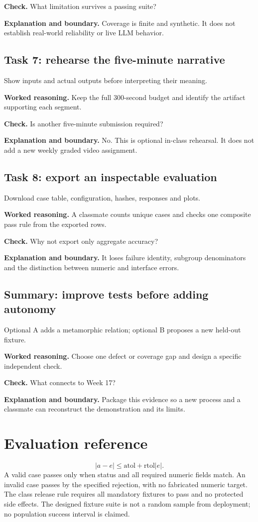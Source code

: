 \textbf{Check.} What limitation survives a passing suite?

\textbf{Explanation and boundary.} Coverage is finite and synthetic. It does not establish real-world reliability or live LLM behavior.

\subsection{Task 7: rehearse the five-minute narrative}
Show inputs and actual outputs before interpreting their meaning.

\textbf{Worked reasoning.} Keep the full 300-second budget and identify the artifact supporting each segment.

\textbf{Check.} Is another five-minute submission required?

\textbf{Explanation and boundary.} No. This is optional in-class rehearsal. It does not add a new weekly graded video assignment.

\subsection{Task 8: export an inspectable evaluation}
Download case table, configuration, hashes, responses and plots.

\textbf{Worked reasoning.} A classmate counts unique cases and checks one composite pass rule from the exported rows.

\textbf{Check.} Why not export only aggregate accuracy?

\textbf{Explanation and boundary.} It loses failure identity, subgroup denominators and the distinction between numeric and interface errors.

\subsection{Summary: improve tests before adding autonomy}
Optional A adds a metamorphic relation; optional B proposes a new held-out fixture.

\textbf{Worked reasoning.} Choose one defect or coverage gap and design a specific independent check.

\textbf{Check.} What connects to Week 17?

\textbf{Explanation and boundary.} Package this evidence so a new process and a classmate can reconstruct the demonstration and its limits.

\section{Evaluation reference}\[|a-e|\leq\mathrm{atol}+\mathrm{rtol}|e|.\]A valid case passes only when status and all required numeric fields match. An invalid case passes by the specified rejection, with no fabricated numeric target. The class release rule requires all mandatory fixtures to pass and no protected side effects. The designed fixture suite is not a random sample from deployment; no population success interval is claimed.
